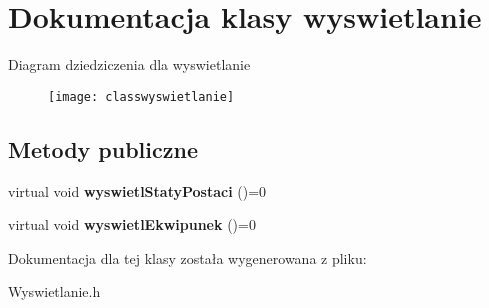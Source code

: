 \hypertarget{classwyswietlanie}{}\section{Dokumentacja klasy wyswietlanie}
\label{classwyswietlanie}
Diagram dziedziczenia dla wyswietlanie\begin{figure}[H]
\begin{center}
\leavevmode
\texttt{[image: classwyswietlanie]}
\end{center}
\end{figure}
\subsection*{Metody publiczne}
\begin{DoxyCompactItemize}
\item 
virtual void {\bfseries wyswietl\+Staty\+Postaci} ()=0\hypertarget{classwyswietlanie_ab3d2fe917f699cfe71f91b595db5513c}{}\label{classwyswietlanie_ab3d2fe917f699cfe71f91b595db5513c}

\item 
virtual void {\bfseries wyswietl\+Ekwipunek} ()=0\hypertarget{classwyswietlanie_ae66e8ba8c3f792d7b6251f7eb7b17da5}{}\label{classwyswietlanie_ae66e8ba8c3f792d7b6251f7eb7b17da5}

\end{DoxyCompactItemize}


Dokumentacja dla tej klasy została wygenerowana z pliku\+:\begin{DoxyCompactItemize}
\item 
Wyswietlanie.\+h\end{DoxyCompactItemize}
